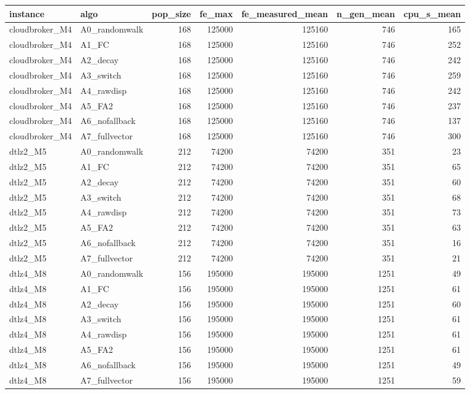 \begin{tabular}{llrrrrr}
\toprule
instance & algo & pop_size & fe_max & fe_measured_mean & n_gen_mean & cpu_s_mean \\
\midrule
cloudbroker_M4 & A0_randomwalk & 168 & 125000 & 125160 & 746 & 165 \\
cloudbroker_M4 & A1_FC & 168 & 125000 & 125160 & 746 & 252 \\
cloudbroker_M4 & A2_decay & 168 & 125000 & 125160 & 746 & 242 \\
cloudbroker_M4 & A3_switch & 168 & 125000 & 125160 & 746 & 259 \\
cloudbroker_M4 & A4_rawdisp & 168 & 125000 & 125160 & 746 & 242 \\
cloudbroker_M4 & A5_FA2 & 168 & 125000 & 125160 & 746 & 237 \\
cloudbroker_M4 & A6_nofallback & 168 & 125000 & 125160 & 746 & 137 \\
cloudbroker_M4 & A7_fullvector & 168 & 125000 & 125160 & 746 & 300 \\
dtlz2_M5 & A0_randomwalk & 212 & 74200 & 74200 & 351 & 23 \\
dtlz2_M5 & A1_FC & 212 & 74200 & 74200 & 351 & 65 \\
dtlz2_M5 & A2_decay & 212 & 74200 & 74200 & 351 & 60 \\
dtlz2_M5 & A3_switch & 212 & 74200 & 74200 & 351 & 68 \\
dtlz2_M5 & A4_rawdisp & 212 & 74200 & 74200 & 351 & 73 \\
dtlz2_M5 & A5_FA2 & 212 & 74200 & 74200 & 351 & 63 \\
dtlz2_M5 & A6_nofallback & 212 & 74200 & 74200 & 351 & 16 \\
dtlz2_M5 & A7_fullvector & 212 & 74200 & 74200 & 351 & 21 \\
dtlz4_M8 & A0_randomwalk & 156 & 195000 & 195000 & 1251 & 49 \\
dtlz4_M8 & A1_FC & 156 & 195000 & 195000 & 1251 & 61 \\
dtlz4_M8 & A2_decay & 156 & 195000 & 195000 & 1251 & 60 \\
dtlz4_M8 & A3_switch & 156 & 195000 & 195000 & 1251 & 61 \\
dtlz4_M8 & A4_rawdisp & 156 & 195000 & 195000 & 1251 & 61 \\
dtlz4_M8 & A5_FA2 & 156 & 195000 & 195000 & 1251 & 61 \\
dtlz4_M8 & A6_nofallback & 156 & 195000 & 195000 & 1251 & 49 \\
dtlz4_M8 & A7_fullvector & 156 & 195000 & 195000 & 1251 & 59 \\

\end{tabular}
